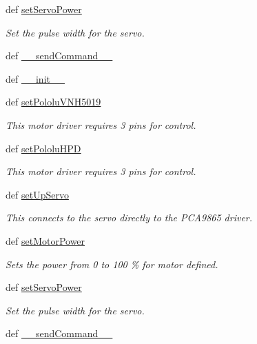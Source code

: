 \begin{DoxyCompactItemize}
def \hyperlink{classinterface_1_1MOTOR__CORE_1_1DC_a9d0cb15bc32abd7e5ffef57a9d83c9b1}{set\+Servo\+Power}
\begin{DoxyCompactList}\small\item\em Set the pulse width for the servo. \end{DoxyCompactList}\item 
def \hyperlink{classinterface_1_1MOTOR__CORE_1_1DC_a143580f4f51c92080dd75f2b70b56d2d}{\+\_\+\+\_\+send\+Command\+\_\+\+\_\+}
\item 
def \hyperlink{classinterface_1_1MOTOR__CORE_1_1DC_a7adcb2ca9d22b0a94b53a09347f9c2b7}{\+\_\+\+\_\+init\+\_\+\+\_\+}
\item 
def \hyperlink{classinterface_1_1MOTOR__CORE_1_1DC_a07432431affa760aec0760871db95d59}{set\+Pololu\+V\+N\+H5019}
\begin{DoxyCompactList}\small\item\em This motor driver requires 3 pins for control. \end{DoxyCompactList}\item 
def \hyperlink{classinterface_1_1MOTOR__CORE_1_1DC_a562d14585f151182842fe34106a1d88c}{set\+Pololu\+H\+P\+D}
\begin{DoxyCompactList}\small\item\em This motor driver requires 3 pins for control. \end{DoxyCompactList}\item 
def \hyperlink{classinterface_1_1MOTOR__CORE_1_1DC_a11b3993f834e3a032134faacc590ad6a}{set\+Up\+Servo}
\begin{DoxyCompactList}\small\item\em This connects to the servo directly to the P\+C\+A9865 driver. \end{DoxyCompactList}\item 
def \hyperlink{classinterface_1_1MOTOR__CORE_1_1DC_acd058e10f316149548b64f26a75f6dc5}{set\+Motor\+Power}
\begin{DoxyCompactList}\small\item\em Sets the power from 0 to 100 \% for motor defined. \end{DoxyCompactList}\item 
def \hyperlink{classinterface_1_1MOTOR__CORE_1_1DC_a9d0cb15bc32abd7e5ffef57a9d83c9b1}{set\+Servo\+Power}
\begin{DoxyCompactList}\small\item\em Set the pulse width for the servo. \end{DoxyCompactList}\item 
def \hyperlink{classinterface_1_1MOTOR__CORE_1_1DC_a143580f4f51c92080dd75f2b70b56d2d}{\+\_\+\+\_\+send\+Command\+\_\+\+\_\+}
\end{DoxyCompactItemize}
